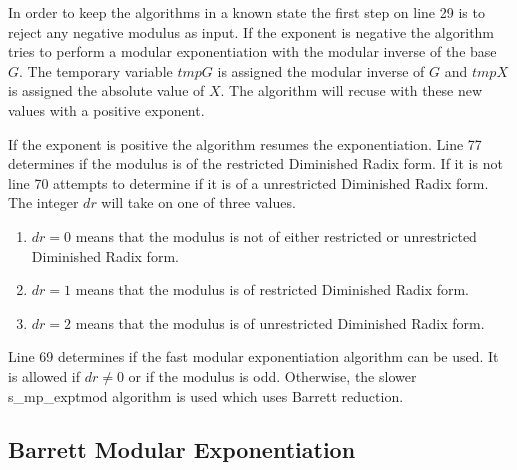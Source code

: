 \documentclass[b5paper]{book}
\begin{document}
In order to keep the algorithms in a known state the first step on line 29 is to reject any negative modulus as input.  If the exponent is
negative the algorithm tries to perform a modular exponentiation with the modular inverse of the base $G$.  The temporary variable $tmpG$ is assigned
the modular inverse of $G$ and $tmpX$ is assigned the absolute value of $X$.  The algorithm will recuse with these new values with a positive
exponent.

If the exponent is positive the algorithm resumes the exponentiation.  Line 77 determines if the modulus is of the restricted Diminished Radix 
form.  If it is not line 70 attempts to determine if it is of a unrestricted Diminished Radix form.  The integer $dr$ will take on one
of three values.

\begin{enumerate}
\item $dr = 0$ means that the modulus is not of either restricted or unrestricted Diminished Radix form.
\item $dr = 1$ means that the modulus is of restricted Diminished Radix form.
\item $dr = 2$ means that the modulus is of unrestricted Diminished Radix form.
\end{enumerate}

Line 69 determines if the fast modular exponentiation algorithm can be used.  It is allowed if $dr \ne 0$ or if the modulus is odd.  Otherwise,
the slower s\_mp\_exptmod algorithm is used which uses Barrett reduction.  

\subsection{Barrett Modular Exponentiation}
\end{document}
